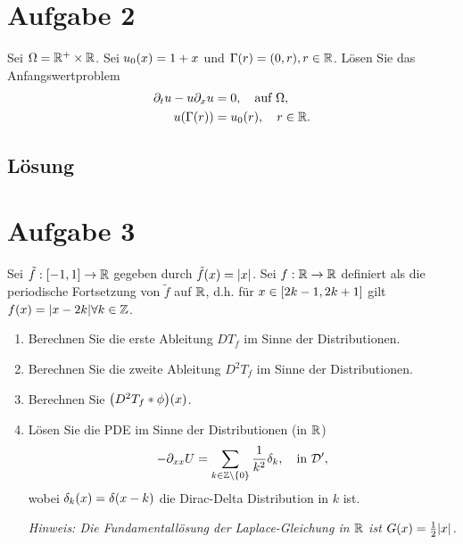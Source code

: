 \documentclass{exercise}
\begin{document}
    \section*{Aufgabe 2}
    
    \begin{problem}
        Sei \(\Omega = \R^+ \times \R\).
        Sei \(u_0\parentheses*{x} = 1 + x\) und \(\Gamma\parentheses*{r} = \parentheses*{0, r}, r \in \R\).
        Lösen Sie das Anfangswertproblem
        \begin{align*}
            \partial_t u - u\partial_x u &= 0, \quad \text{auf }\Omega,\\
            u\parentheses*{\Gamma\parentheses*{r}} &= u_0\parentheses*{r}, \quad r \in \R.
        \end{align*}
    \end{problem}
    
    \subsection*{Lösung}


    \section*{Aufgabe 3}
    
    \begin{problem}
        Sei \(\tilde{f}: \brackets*{-1, 1} \to \R\) gegeben durch \(\tilde{f}\parentheses*{x} = \absolute*{x}\).
        Sei \(f: \R \to \R\) definiert als die periodische Fortsetzung von \(\tilde{f}\) auf \(\R\), d.h. für \(x \in \brackets*{2k - 1, 2k + 1}\) gilt \(f\parentheses*{x} = \absolute*{x - 2k} \forall k \in \Z\).
        \begin{enumerate}
            \item Berechnen Sie die erste Ableitung \(DT_f\) im Sinne der Distributionen.
            \item Berechnen Sie die zweite Ableitung \(D^2 T_f\) im Sinne der Distributionen.
            \item Berechnen Sie \(\parentheses*{D^2 T_f * \phi}\parentheses*{x}\).
            \item Lösen Sie die PDE im Sinne der Distributionen (in \(\R\))
            \[
                -\partial_{xx}U = \sum_{k \in \Z \setminus \braces*{0}}\frac{1}{k^2}\delta_k, \quad \text{in }\mathcal{D}',
            \]
            wobei \(\delta_k\parentheses*{x} = \delta\parentheses*{x - k}\) die Dirac-Delta Distribution in \(k\) ist.

            \emph{Hinweis: Die Fundamentallösung der Laplace-Gleichung in \(\R\) ist \(G\parentheses*{x} = \frac{1}{2}\absolute*{x}\).}
        \end{enumerate}
    \end{problem}
    
\end{document}
